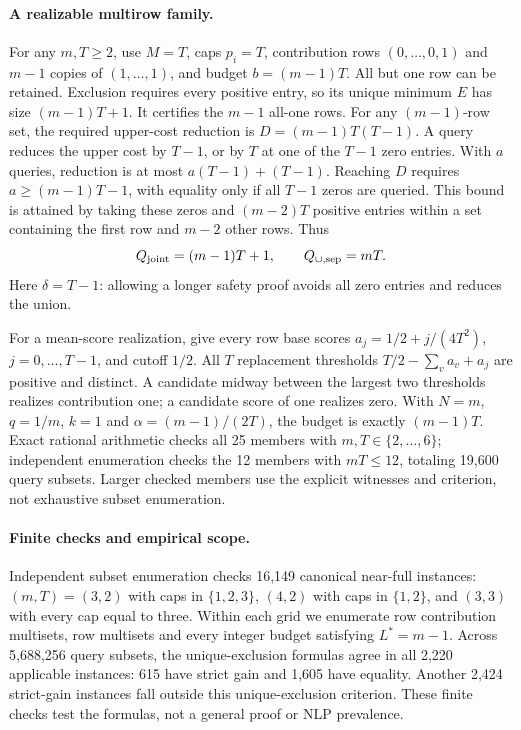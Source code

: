 \paragraph{A realizable multirow family.}
For any $m,T\ge2$, use $M=T$, caps $p_i=T$, contribution rows $(0,\ldots,0,1)$ and $m-1$ copies of $(1,\ldots,1)$, and budget $b=(m-1)T$. All but one row can be retained. Exclusion requires every positive entry, so its unique minimum $E$ has size $(m-1)T+1$. It certifies the $m-1$ all-one rows. For any $(m-1)$-row set, the required upper-cost reduction is $D=(m-1)T(T-1)$. A query reduces the upper cost by $T-1$, or by $T$ at one of the $T-1$ zero entries. With $a$ queries, reduction is at most $a(T-1)+(T-1)$. Reaching $D$ requires $a\ge(m-1)T-1$, with equality only if all $T-1$ zeros are queried. This bound is attained by taking these zeros and $(m-2)T$ positive entries within a set containing the first row and $m-2$ other rows. Thus
\[
 Q_{\rm joint}=(m-1)T+1,\qquad Q_{\cup,\rm sep}=mT.
\]
Here $\delta=T-1$: allowing a longer safety proof avoids all zero entries and reduces the union.

For a mean-score realization, give every row base scores $a_j=1/2+j/(4T^2)$, $j=0,\ldots,T-1$, and cutoff $1/2$. All $T$ replacement thresholds $T/2-\sum_v a_v+a_j$ are positive and distinct. A candidate midway between the largest two thresholds realizes contribution one; a candidate score of one realizes zero. With $N=m$, $q=1/m$, $k=1$ and $\alpha=(m-1)/(2T)$, the budget is exactly $(m-1)T$. Exact rational arithmetic checks all 25 members with $m,T\in\{2,\ldots,6\}$; independent enumeration checks the 12 members with $mT\le12$, totaling 19,600 query subsets. Larger checked members use the explicit witnesses and criterion, not exhaustive subset enumeration.

\paragraph{Finite checks and empirical scope.}
Independent subset enumeration checks 16,149 canonical near-full instances: $(m,T)=(3,2)$ with caps in $\{1,2,3\}$, $(4,2)$ with caps in $\{1,2\}$, and $(3,3)$ with every cap equal to three. Within each grid we enumerate row contribution multisets, row multisets and every integer budget satisfying $L^*=m-1$. Across 5,688,256 query subsets, the unique-exclusion formulas agree in all 2,220 applicable instances: 615 have strict gain and 1,605 have equality. Another 2,424 strict-gain instances fall outside this unique-exclusion criterion. These finite checks test the formulas, not a general proof or NLP prevalence.

